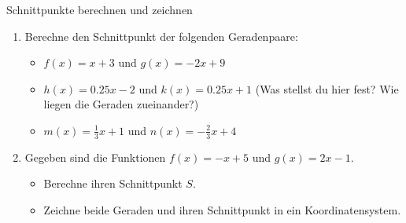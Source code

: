 \begin{aufgabenumgebung}{Schnittpunkte berechnen und zeichnen}
\begin{enumerate}
    \item Berechne den Schnittpunkt der folgenden Geradenpaare:
        \begin{itemize}
            \item $f(x) = x + 3$ und $g(x) = -2x + 9$
            \item $h(x) = 0.25x - 2$ und $k(x) = 0.25x + 1$ (Was stellst du hier fest? Wie liegen die Geraden zueinander?)
            \item $m(x) = \frac{1}{3}x + 1$ und $n(x) = -\frac{2}{3}x + 4$
        \end{itemize}
    \item Gegeben sind die Funktionen $f(x) = -x+5$ und $g(x) = 2x-1$.
        \begin{itemize}
            \item Berechne ihren Schnittpunkt $S$.
            \item Zeichne beide Geraden und ihren Schnittpunkt in ein Koordinatensystem.
        \end{itemize}
\end{enumerate}
\end{aufgabenumgebung}


